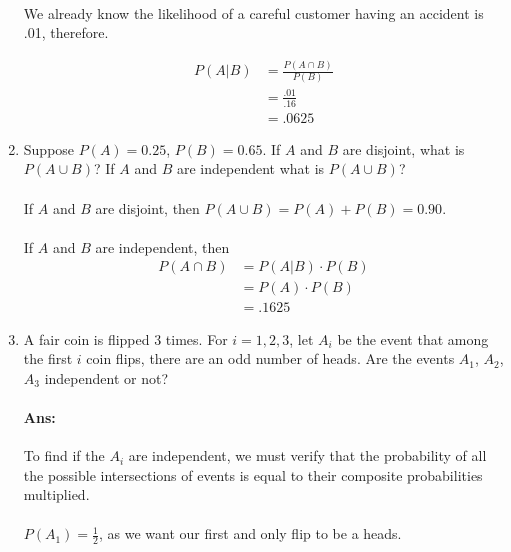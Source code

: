 \documentclass{article}
\begin{document}
\begin{enumerate}
    \paragraph{}We already know the likelihood of a careful customer having an accident is 
    .01, therefore.
    
    \begin{align*}
        P(A|B) &= \frac{P(A \cap B)}{P(B)}\\
               &= \frac{.01}{.16}\\
               &= .0625
    \end{align*}

    \item Suppose $P(A) = 0.25$, $P(B) = 0.65$. If $A$ and $B$ are disjoint, what is $P(A \cup B)$?
        If $A$ and $B$ are independent what is $P(A \cup B)$?

    \paragraph{}If $A$ and $B$ are disjoint, then $P(A \cup B) = P(A) + P(B) = 0.90$.
    \paragraph{}If $A$ and $B$ are independent, then
    \begin{align*}
        P(A \cap B) &= P(A|B)\cdot P(B) \\
                    &= P(A) \cdot P(B)\\
                    &= .1625
    \end{align*}

    \item A fair coin is flipped 3 times. For $i = 1, 2, 3$, let $A_i$ be the event that among the first $i$
coin flips, there are an odd number of heads. Are the events $A_1$, $A_2$, $A_3$ independent or
not?
    \paragraph{Ans:}To find if the $A_i$ are independent, we must verify that the probability of all the possible
    intersections of events is equal to their composite probabilities multiplied.

    \paragraph{} $P(A_1) = \frac{1}{2}$, as we want our first and only flip to be a heads.

\end{enumerate}
\end{document}
